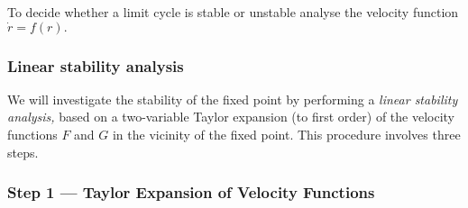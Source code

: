 \documentclass[12pt, a4paper]{article}
\theoremstyle{definition}
\theoremstyle{plain}
\begin{document}
To decide whether a limit cycle is stable or unstable analyse the velocity function $\dot{r}=f(r).$



\subsubsection{Linear stability analysis}

We will investigate the stability of the fixed point by performing a \textit{linear stability analysis,} based on a two-variable Taylor expansion (to first order) of the velocity functions $F$ and $G$ in the vicinity of the fixed point. This procedure involves three steps.

\subsubsection*{Step 1 — Taylor Expansion of Velocity Functions}
\end{document}
